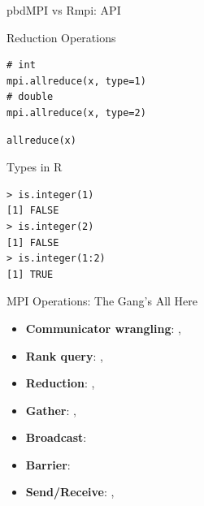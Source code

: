 \begin{frame}[fragile]
  \begin{block}{pbdMPI vs Rmpi:  API}
    \pause
    \begin{center}
      \begin{minipage}{.45\textwidth}
        \begin{block}{Reduction Operations}
          \begin{lstlisting}[title=Rmpi]
# int
mpi.allreduce(x, type=1)
# double
mpi.allreduce(x, type=2)
          \end{lstlisting}

          \begin{lstlisting}[title=pbdMPI]
allreduce(x)
          \end{lstlisting}
        \end{block}
      \end{minipage}
      \hspace{.3cm}
      \pause
      \begin{minipage}{.45\textwidth}
        \begin{block}{Types in R}
          \begin{lstlisting}
> is.integer(1)
[1] FALSE
> is.integer(2)
[1] FALSE
> is.integer(1:2)
[1] TRUE
         \end{lstlisting}
       \end{block}
     \end{minipage}
   \end{center}

 \end{block}
\end{frame}

\begin{frame}
  \begin{block}{MPI Operations: The Gang's All Here}\pause
    \begin{itemize}
      \item \textbf{Communicator wrangling}: {\color{blue},   
}\\[.4cm]
      \item \textbf{Rank query}: {\color{blue}, }\\[.4cm]
      \item \textbf{Reduction}: ,     
{\color{blue}}\\[.4cm]
      \item \textbf{Gather}: , {\color{blue}}\\[.4cm]
      \item \textbf{Broadcast}: \\[.4cm]
      \item \textbf{Barrier}: \\[.4cm]
      \item \textbf{Send/Receive}: , 
    \end{itemize}
  \end{block}
\end{frame}


